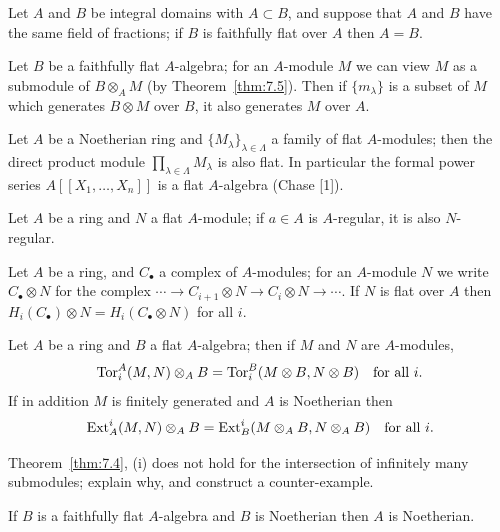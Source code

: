 \begin{exercise}\label{ex:7.2-ex}
Let $A$ and $B$ be integral domains with $A \subset B$, and suppose that $A$ and $B$
have the same field of fractions; if $B$ is faithfully flat over $A$ then $A = B$.
\end{exercise}

\begin{exercise}\label{ex:7.3-ex}
Let $B$ be a faithfully flat $A$-algebra; for an $A$-module $M$ we can view $M$ as a
submodule of $B \otimes_A M$ (by Theorem~\ref{thm:7.5}). Then if $\{m_\lambda\}$ is a subset of $M$
which generates $B \otimes M$ over $B$, it also generates $M$ over $A$.
\end{exercise}

\begin{exercise}\label{ex:7.4-ex}
Let $A$ be a Noetherian ring and $\{M_\lambda\}_{\lambda \in \Lambda}$ a family of flat $A$-modules; then
the direct product module $\prod_{\lambda \in \Lambda} M_\lambda$ is also flat. In particular the formal
power series $A[[X_1, \ldots, X_n]]$ is a flat $A$-algebra (Chase [1]).
\end{exercise}

\begin{exercise}\label{ex:7.5-ex}
Let $A$ be a ring and $N$ a flat $A$-module; if $a \in A$ is $A$-regular, it is also $N$-
regular.
\end{exercise}

\begin{exercise}\label{ex:7.6-ex}
Let $A$ be a ring, and $C_\bullet$ a complex of $A$-modules; for an $A$-module $N$ we
write $C_\bullet \otimes N$ for the complex $\cdots \to C_{i+1} \otimes N \to C_i \otimes N \to \cdots$. If
$N$ is flat over $A$ then $H_i(C_\bullet) \otimes N = H_i(C_\bullet \otimes N)$ for all $i$.
\end{exercise}

\begin{exercise}\label{ex:7.7-ex}
Let $A$ be a ring and $B$ a flat $A$-algebra; then if $M$ and $N$ are $A$-modules,
\[
  \operatorname{Tor}^A_i(M, N) \otimes_A B = \operatorname{Tor}^B_i(M \otimes B, N \otimes B) \quad \text{for all } i.
\]
If in addition $M$ is finitely generated and $A$ is Noetherian then
\[
  \operatorname{Ext}^i_A(M, N) \otimes_A B = \operatorname{Ext}^i_B(M \otimes_A B, N \otimes_A B) \quad \text{for all } i.
\]
\end{exercise}

\begin{exercise}\label{ex:7.8-ex}
Theorem~\ref{thm:7.4}, (i) does not hold for the intersection of infinitely many
submodules; explain why, and construct a counter-example.
\end{exercise}

\begin{exercise}\label{ex:7.9-ex}
If $B$ is a faithfully flat $A$-algebra and $B$ is Noetherian then $A$ is Noetherian.
\end{exercise}
